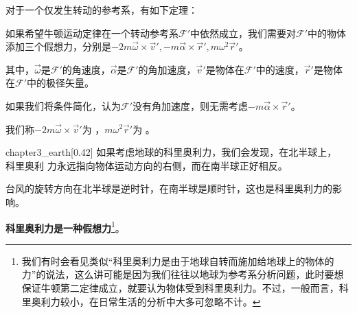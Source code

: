 对于一个仅发生转动的参考系，有如下定理：
\begin{law}
	如果希望牛顿运动定律在一个转动参考系$\mathcal{F}'$中依然成立，我们需要对$\mathcal{F}'$中的物体添加三个假想力，分别是$-2m\vec{\omega}\times\vec{v}',-m\vec{\alpha}\times\vec{r}',m\omega^2\vec{r}'$。
	
	其中，$\vec{\omega}$是$\mathcal{F}'$的角速度，$\vec{\alpha}$是$\mathcal{F}'$的角加速度，$\vec{v}'$是物体在$\mathcal{F}'$中的速度，$\vec{r}'$是物体在$\mathcal{F}'$中的极径矢量。
	
	如果我们将条件简化，认为$\mathcal{F}'$没有角加速度，则无需考虑$-m\vec{\alpha}\times\vec{r}'$。
	
	我们称$-2m\vec{\omega}\times\vec{v}'$为 ，$m\omega^2\vec{r}'$为 。
\end{law}
\begin{singlefigure}[地球的科里奥利力]{chapter3_earth}[0.42]
如果考虑地球的科里奥利力，我们会发现，在北半球上，\\科里奥利
力永远指向物体运动方向的右侧，而在南半球正好相反。
\end{singlefigure}
台风的旋转方向在北半球是逆时针，在南半球是顺时针，这也是科里奥利力的影响。

{\bfseries 科里奥利力是一种假想力}\footnote{我们有时会看见类似“科里奥利力是由于地球自转而施加给地球上的物体的力”的说法，这么讲可能是因为我们往往以地球为参考系分析问题，此时要想保证牛顿第二定律成立，就要认为物体受到科里奥利力。不过，一般而言，科里奥利力较小，在日常生活的分析中大多可忽略不计。}。
